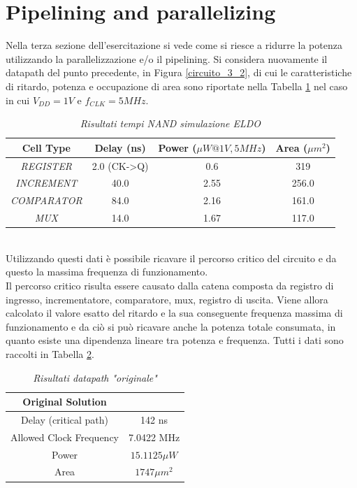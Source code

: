 \section{Pipelining and parallelizing}
Nella terza sezione dell'esercitazione si vede come si riesce a ridurre la potenza utilizzando la parallelizzazione e/o il pipelining. Si considera nuovamente il datapath del punto precedente, in Figura \ref{circuito_3_2}, di cui le caratteristiche di ritardo, potenza e occupazione di area sono riportate nella Tabella \ref{Tab33_1} nel caso in cui $V_{DD}=1 V$ e $f_{CLK}=5 MHz$.
\begin{table}[!h]\footnotesize
	\centering
	\begin{tabular}{|c|c|c|c|}
		\hline
		\textbf{Cell Type}& \textbf{Delay (ns)} & \textbf{Power ($\mu W @1 V, 5 MHz$)} & \textbf{Area ($\mu m^{2}$)} \\
		\hline
		\textit{REGISTER}& 2.0 (CK->Q) & 0.6 & 319 \\
	\textit{INCREMENT}& 40.0 & 2.55 & 256.0 \\
		\textit{COMPARATOR} & 84.0 & 2.16 & 161.0\\
		\textit{MUX} & 14.0 & 1.67& 117.0\\
		\hline
	\end{tabular}
	\caption{\textit{Risultati tempi NAND simulazione ELDO}}
	\label{Tab33_1}
\end{table}
\\
Utilizzando questi dati è possibile ricavare il percorso critico del circuito e da questo la massima frequenza di funzionamento.\\
Il percorso critico risulta essere causato dalla catena composta da registro di ingresso, incrementatore, comparatore, mux, registro di uscita. Viene allora calcolato il valore esatto del ritardo e la sua conseguente frequenza massima di funzionamento e da ciò si può ricavare anche la potenza totale consumata, in quanto esiste una dipendenza lineare tra potenza e frequenza. Tutti i dati sono raccolti in Tabella \ref{Tab33_2}.
\begin{table}[!h]\footnotesize
	\centering
	\begin{tabular}{|c|c|}
		\hline
		\textbf{Original Solution} & \\
		\hline
		Delay (critical path) & 142 ns\\
		Allowed Clock Frequency & 7.0422 MHz\\
		Power & $15.1125 \mu W$\\
		Area & $1747 \mu m^{2}$\\
		\hline
	\end{tabular}
	\caption{\textit{Risultati datapath "originale"}}
	\label{Tab33_2}
\end{table}
